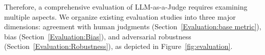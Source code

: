 Therefore, a comprehensive evaluation of LLM-as-a-Judge requires examining multiple aspects. 
We organize existing evaluation studies into three major dimensions: agreement with human judgments (Section~\ref{Evaluation:base metric}), bias (Section~\ref{Evaluation:Bias}), and adversarial robustness (Section~\ref{Evaluation:Robustness}), as depicted in Figure~\ref{fig:evaluation}.


%         





